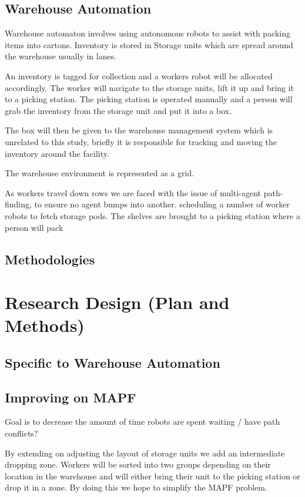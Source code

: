 \documentclass[a4paper,11pt]{article}
\begin{document}
\subsection{Warehouse Automation}
Warehouse automaton involves using autonomous robots to assist with packing items into cartons. Inventory is stored in Storage units which are spread around the warehouse usually in lanes.

An inventory is tagged for collection and a workers robot will be allocated accordingly. The worker will navigate to the storage units, lift it up and bring it to a picking station. The picking station is operated manually and a person will grab the inventory from the storage unit and put it into a box. 

The box will then be given to the warehouse management system which is unrelated to this study, briefly it is responsible for tracking and moving the inventory around the facility.

The warehouse environment is represented as a grid.

As workers travel down rows we are faced with the issue of multi-agent path-finding, to ensure no agent bumps into another. scheduling a number of worker robots to fetch storage pods. The shelves are brought to a picking station where a person will pack 

\subsection{Methodologies}

\section{Research Design (Plan and Methods)}

\subsection{Specific to Warehouse Automation}

\subsection{Improving on MAPF}
Goal is to decrease the amount of time robots are spent waiting / have path conflicts?

By extending on adjusting the layout of storage units we add an intermediate dropping zone. Workers will be sorted into two groups depending on their location in the warehouse and will either bring their unit to the picking station or drop it in a zone. By doing this we hope to simplify the MAPF problem.
\end{document}
